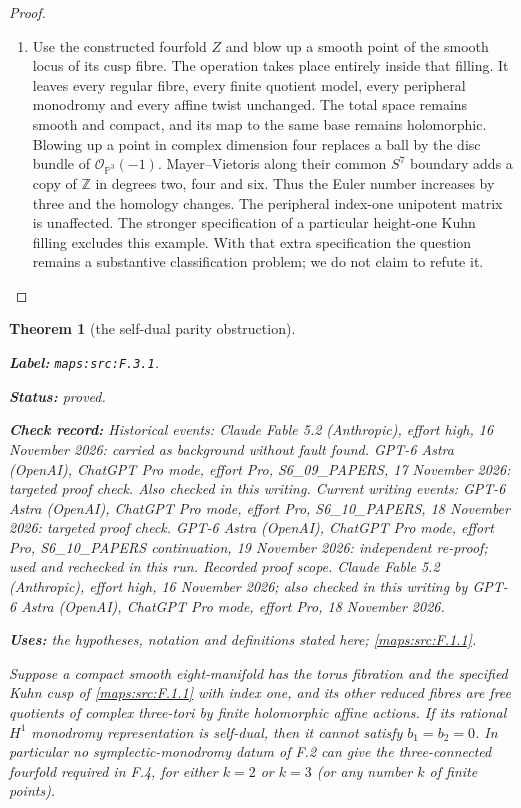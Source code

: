 \documentclass[11pt,a4paper]{article}
\newtheorem{theorem}{Theorem}[section]
\theoremstyle{definition}
\newcommand{\StatementRecord}[4]{\par\smallskip\begingroup\upshape\raggedright\noindent\textbf{Label:} \nolinkurl{#1}.\par\noindent\textbf{Status:} #2.\par\noindent\textbf{Check record:} #3.\par\noindent\textbf{Uses:} #4.\par\endgroup\smallskip}
\begin{document}
\begin{proof}
\begin{enumerate}[label=\arabic*.]
\item Use the constructed fourfold $Z$ and blow up a smooth point
of the smooth locus of its cusp fibre.  The operation takes
place entirely inside that filling.  It leaves every regular
fibre, every finite quotient model, every peripheral monodromy
and every affine twist unchanged.  The total space remains
smooth and compact, and its map to the same base remains
holomorphic.  Blowing up a point in complex dimension four
replaces a ball by the disc bundle of $\mathcal O_{\mathbb P^3}(-1)$.
Mayer--Vietoris along their common $S^7$ boundary adds a copy
of $\mathbb Z$ in degrees two, four and six.  Thus the Euler
number increases by three and the homology changes.  The
peripheral index-one unipotent matrix is unaffected.
The stronger specification of a particular height-one Kuhn
filling excludes this example.  With that extra specification
the question remains a substantive classification problem;
we do not claim to refute it.

\end{enumerate}
\end{proof}




\begin{theorem}[the self-dual parity obstruction]\label{maps:src:F.3.1}
\StatementRecord{maps:src:F.3.1}{proved}{Historical events: Claude Fable 5.2 (Anthropic), effort high, 16 November 2026: carried as background without fault found. GPT-6 Astra (OpenAI), ChatGPT Pro mode, effort Pro, S6\_09\_PAPERS, 17 November 2026: targeted proof check. Also checked in this writing. Current writing events: GPT-6 Astra (OpenAI), ChatGPT Pro mode, effort Pro, S6\_10\_PAPERS, 18 November 2026: targeted proof check. GPT-6 Astra (OpenAI), ChatGPT Pro mode, effort Pro, S6\_10\_PAPERS continuation, 19 November 2026: independent re-proof; used and rechecked in this run. \emph{Recorded proof scope.} Claude Fable 5.2 (Anthropic), effort high, 16 November 2026; also checked in this writing by GPT-6 Astra (OpenAI), ChatGPT Pro mode, effort Pro, 18 November 2026}{the hypotheses, notation and definitions stated here; \cref{maps:src:F.1.1}}


Suppose a compact smooth eight-manifold has the torus fibration
and the specified Kuhn cusp of \ref{maps:src:F.1.1} with index one, and its
other reduced fibres are free quotients of complex three-tori
by finite holomorphic affine actions.  If its rational
$H^1$ monodromy representation is self-dual, then it cannot
satisfy $b_1=b_2=0$.  In particular no symplectic-monodromy
datum of F.2 can give the three-connected fourfold required
in F.4, for either $k=2$ or $k=3$ (or any number $k$ of finite
points).

\end{theorem}
\end{document}
